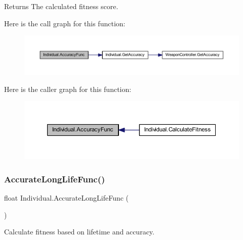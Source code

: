 \begin{DoxyReturn}{Returns}
The calculated fitness score.
\end{DoxyReturn}
Here is the call graph for this function\+:\nopagebreak
\begin{figure}[H]
\begin{center}
\leavevmode
\includegraphics[width=350pt]{class_individual_ae29881ad8bfa0ec8db58c650ac33eaf0_cgraph}
\end{center}
\end{figure}
Here is the caller graph for this function\+:\nopagebreak
\begin{figure}[H]
\begin{center}
\leavevmode
\includegraphics[width=350pt]{class_individual_ae29881ad8bfa0ec8db58c650ac33eaf0_icgraph}
\end{center}
\end{figure}
\mbox{\label{class_individual_ae28e091935420b6ab5ccda6ce24e1396}} 
\subsubsection{\texorpdfstring{Accurate\+Long\+Life\+Func()}{AccurateLongLifeFunc()}}
{\footnotesize\ttfamily float Individual.\+Accurate\+Long\+Life\+Func (\begin{DoxyParamCaption}{ }\end{DoxyParamCaption})}



Calculate fitness based on lifetime and accuracy. 

